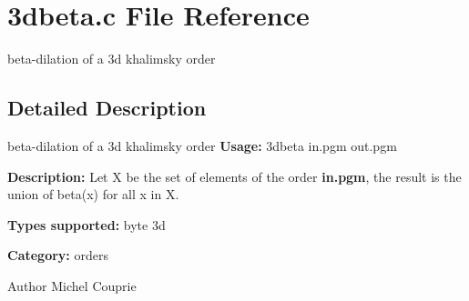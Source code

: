 \section{3dbeta.c File Reference}
\label{3dbeta_8c}


beta-\/dilation of a 3d khalimsky order  




\subsection{Detailed Description}
beta-\/dilation of a 3d khalimsky order {\bfseries Usage:} 3dbeta in.pgm out.pgm

{\bfseries Description:} Let X be the set of elements of the order {\bfseries in.pgm}, the result is the union of beta(x) for all x in X.

{\bfseries Types supported:} byte 3d

{\bfseries Category:} orders

\begin{DoxyAuthor}{Author}
Michel Couprie 
\end{DoxyAuthor}
